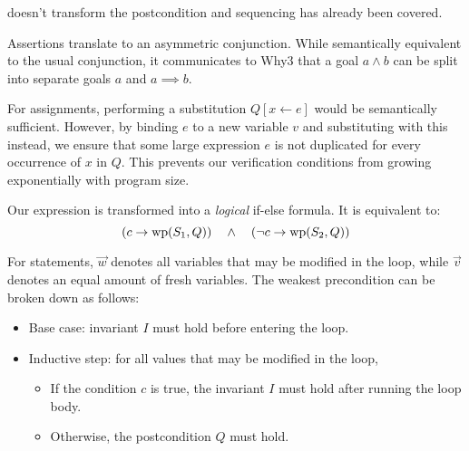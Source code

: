  doesn't transform the postcondition and sequencing has already been covered.

Assertions translate to an asymmetric conjunction.
While semantically equivalent to the usual conjunction, it communicates to Why3
that a goal $a \land b$ can be split into separate goals $a$ and $a \implies b$.

For assignments, performing a substitution $Q[x \leftarrow e]$ would be semantically sufficient.
However, by binding $e$ to a new variable $v$ and substituting with this instead,
we ensure that some large expression $e$ is not duplicated for every occurrence of $x$ in $Q$.
This prevents our verification conditions from growing exponentially with program size.

Our  expression is transformed into a \textit{logical} if-else formula.
It is equivalent to:
\[
    (c  \rightarrow \mathrm{wp}(S_1, Q)) ~~~\land~~~
    (\neg c  \rightarrow \mathrm{wp}(S_2, Q))
\]

For  statements,
$\overset{\rightarrow} w$ denotes all variables that may be modified in the loop,
while $\overset{\rightarrow} v$ denotes an equal amount of fresh variables.
The weakest precondition can be broken down as follows:
\begin{itemize}
    \item Base case: invariant $I$ must hold before entering the loop.
    \item Inductive step: for all values that may be modified in the loop,
    \begin{itemize}
        \item If the condition $c$ is true, the invariant $I$ must hold after running the loop body.
        \item Otherwise, the postcondition $Q$ must hold.
    \end{itemize}
\end{itemize}
